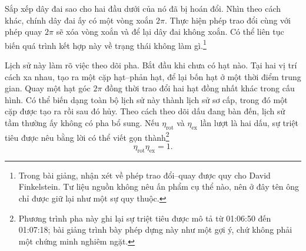 Sắp xếp dây đai sao cho hai đầu dưới của nó đã bị hoán đổi. Nhìn theo cách khác, chính dây đai ấy có một vòng xoắn \(2\pi\). Thực hiện phép trao đổi cùng với phép quay \(2\pi\) sẽ xóa vòng xoắn và để lại dây đai không xoắn. Có thể liên tục biến quá trình kết hợp này về trạng thái không làm gì.\footnote{Trong bài giảng, nhận xét về phép trao đổi--quay được quy cho David Finkelstein. Tư liệu nguồn không nêu ấn phẩm cụ thể nào, nên ở đây tên ông chỉ được giữ lại như một sự quy thuộc.}

\begin{classroomqa}
\end{classroomqa}

Lịch sử này làm rõ việc theo dõi pha. Bắt đầu khi chưa có hạt nào. Tại hai vị trí cách xa nhau, tạo ra một cặp hạt--phản hạt, để lại bốn hạt ở một thời điểm trung gian. Quay một hạt góc \(2\pi\) đồng thời trao đổi hai hạt đồng nhất khác trong cấu hình. Có thể biến dạng toàn bộ lịch sử này thành lịch sử sơ cấp, trong đó một cặp được tạo ra rồi sau đó hủy. Theo cách theo dõi dấu đang bàn đến, lịch sử tầm thường ấy không có pha bổ sung. Nếu \(\eta_{\mathrm{rot}}\) và \(\eta_{\mathrm{ex}}\) lần lượt là hai dấu, sự triệt tiêu được nêu bằng lời có thể viết gọn thành\footnote{Phương trình pha này ghi lại sự triệt tiêu được mô tả từ 01:06:50 đến 01:07:18; bài giảng trình bày phép dựng này như một gợi ý, chứ không phải một chứng minh nghiêm ngặt.}
\begin{equation}
\eta_{\mathrm{rot}}\eta_{\mathrm{ex}}=1.
\end{equation}

\begin{classroomqa}
\end{classroomqa}

